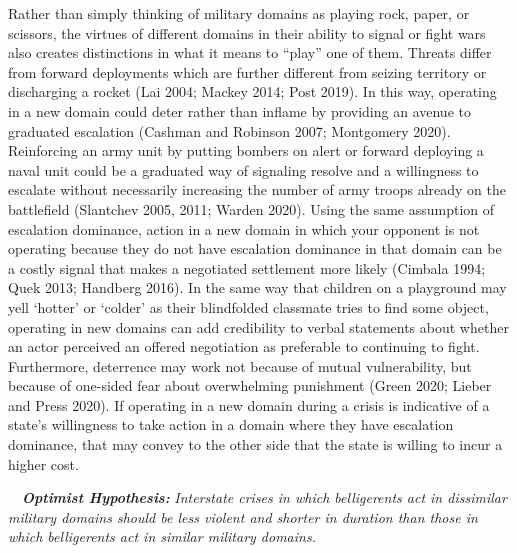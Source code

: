 \documentclass[
]{article}
\begin{document}
Rather than simply thinking of military domains as playing rock, paper, or scissors, the virtues of different domains in their ability to signal or fight wars also creates distinctions in what it means to ``play'' one of them. Threats differ from forward deployments which are further different from seizing territory or discharging a rocket (Lai 2004; Mackey 2014; Post 2019). In this way, operating in a new domain could deter rather than inflame by providing an avenue to graduated escalation (Cashman and Robinson 2007; Montgomery 2020). Reinforcing an army unit by putting bombers on alert or forward deploying a naval unit could be a graduated way of signaling resolve and a willingness to escalate without necessarily increasing the number of army troops already on the battlefield (Slantchev 2005, 2011; Warden 2020). Using the same assumption of escalation dominance, action in a new domain in which your opponent is not operating because they do not have escalation dominance in that domain can be a costly signal that makes a negotiated settlement more likely (Cimbala 1994; Quek 2013; Handberg 2016). In the same way that children on a playground may yell `hotter' or `colder' as their blindfolded classmate tries to find some object, operating in new domains can add credibility to verbal statements about whether an actor perceived an offered negotiation as preferable to continuing to fight. Furthermore, deterrence may work not because of mutual vulnerability, but because of one-sided fear about overwhelming punishment (Green 2020; Lieber and Press 2020). If operating in a new domain during a crisis is indicative of a state's willingness to take action in a domain where they have escalation dominance, that may convey to the other side that the state is willing to incur a higher cost.

~~\textbf{\textit{Optimist Hypothesis:}}\textit{ Interstate crises in which belligerents act in dissimilar military domains should be less violent and shorter in duration than those in which belligerents act in similar military domains.}
\end{document}
